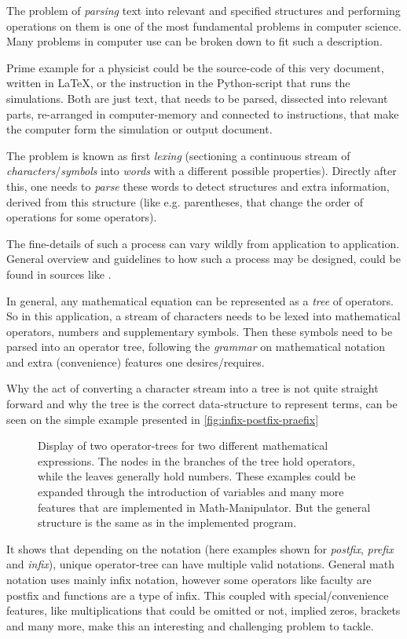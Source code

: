 The problem of \emph{parsing} text into relevant and specified structures and performing operations on them is one of the most fundamental problems in computer science. 
Many problems in computer use can be broken down to fit such a description.

Prime example for a physicist could be the source-code of this very document, written in \LaTeX, or the instruction in the Python-script that runs the simulations. 
Both are just text, that needs to be parsed, dissected into relevant parts, re-arranged in computer-memory and connected to instructions, that make the computer form the simulation or output document.

The problem is known as first \emph{lexing} (sectioning a continuous stream of \emph{characters}/\emph{symbols} into \emph{words} with a different possible properties).
Directly after this, one needs to \emph{parse} these words to detect structures and extra information, derived from this structure (like e.g. parentheses, that change the order of operations for some operators).

The fine-details of such a process can vary wildly from application to application. 
General overview and guidelines to how such a process may be designed, could be found in sources like \cite{compilersDragonBook}.

In general, any mathematical equation can be represented as a \emph{tree} of operators.
So in this application, a stream of characters needs to be lexed into mathematical operators, numbers and supplementary symbols.
Then these symbols need to be parsed into an operator tree, following the \emph{grammar} on mathematical notation and extra (convenience) features one desires/requires. 

Why the act of converting a character stream into a tree is not quite straight forward and why the tree is the correct data-structure to represent terms, can be seen on the simple example presented in \autoref{fig:infix-postfix-praefix}

\begin{figure}[htbp]
    
    \caption{Display of two operator-trees for two different mathematical expressions. 
    The nodes in the branches of the tree hold operators, while the leaves generally hold numbers. These examples could be expanded through the introduction of variables and many more features that are implemented in Math-Manipulator. But the general structure is the same as in the implemented program.}
    \label{fig:infix-postfix-praefix}
\end{figure}

It shows that depending on the notation (here examples shown for \emph{postfix}, \emph{prefix} and \emph{infix}), unique operator-tree can have multiple valid notations. 
General math notation uses mainly infix notation, however some operators like faculty are postfix and functions are a type of infix.
This coupled with special/convenience features, like multiplications that could be omitted or not, implied zeros, brackets and many more, make this an interesting and challenging problem to tackle.
